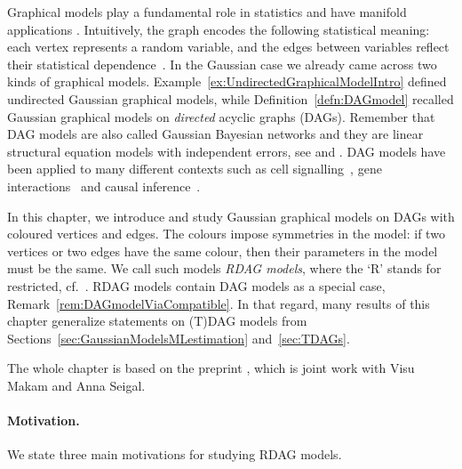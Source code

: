 






Graphical models play a fundamental role in statistics and have manifold applications \cite{LauritzenBook, HandbookGraphical}. 
Intuitively, the graph encodes the following statistical meaning: each vertex represents a random variable, and the edges between variables reflect their statistical dependence~\cite{verma1990causal}. In the Gaussian case we already came across two kinds of graphical models. Example~\ref{ex:UndirectedGraphicalModelIntro} defined undirected Gaussian graphical models, while Definition~\ref{defn:DAGmodel} recalled Gaussian graphical models on \emph{directed} acyclic graphs (DAGs).
Remember that DAG models are also called Gaussian Bayesian networks and they are linear structural equation models with independent errors, see \cite{drton2018algebraic} and \cite[Section~16.2]{SullivantBook}. 
DAG models have been applied to many different contexts such as cell signalling~\cite{sachs2005causal}, gene interactions~\cite{friedman2000using} and causal inference~\cite{pearl2009causality}.

In this chapter, we introduce and study Gaussian graphical models on DAGs with coloured vertices and edges. The colours impose symmetries in the model: if two vertices or two edges have the same colour, then their parameters in the model must be the same. We call such models \emph{RDAG models}, where the `R' stands for restricted, cf.~\cite{hojsgaard2008graphical}. RDAG models contain DAG models as a special case, Remark~\ref{rem:DAGmodelViaCompatible}. In that regard, many results of this chapter generalize statements on (T)DAG models from Sections~\ref{sec:GaussianModelsMLestimation} and~\ref{sec:TDAGs}.

The whole chapter is based on the preprint \cite{RDAG}, which is joint work with Visu Makam and Anna Seigal.


\paragraph{Motivation.}
We state three main motivations for studying RDAG models.


